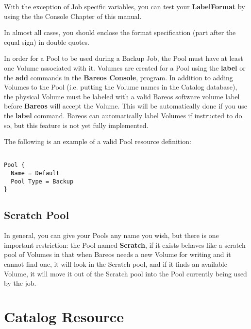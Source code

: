 \begin{description}
With the exception of Job specific variables, you can test your {\bf
LabelFormat} by using the  the Console Chapter
of this manual.

In almost all cases, you should enclose the format specification (part
after the equal sign) in double quotes.



\end{description}

In order for a Pool to be used during a Backup Job, the Pool must have at
least one Volume associated with it.  Volumes are created for a Pool using
the {\bf label} or the {\bf add} commands in the {\bf Bareos Console},
program.  In addition to adding Volumes to the Pool (i.e.  putting the
Volume names in the Catalog database), the physical Volume must be labeled
with a valid Bareos software volume label before {\bf Bareos} will accept
the Volume.  This will be automatically done if you use the {\bf label}
command.  Bareos can automatically label Volumes if instructed to do so,
but this feature is not yet fully implemented.

The following is an example of a valid Pool resource definition:

\footnotesize
\begin{verbatim}

Pool {
  Name = Default
  Pool Type = Backup
}
\end{verbatim}
\normalsize

\subsection{Scratch Pool}
\label{TheScratchPool}

In general, you can give your Pools any name you wish, but there is one
important restriction: the Pool named {\bf Scratch}, if it exists behaves
like a scratch pool of Volumes in that when Bareos needs a new Volume for
writing and it cannot find one, it will look in the Scratch pool, and if
it finds an available Volume, it will move it out of the Scratch pool into
the Pool currently being used by the job.

\section{Catalog Resource}
\label{DirectorResourceCatalog}

